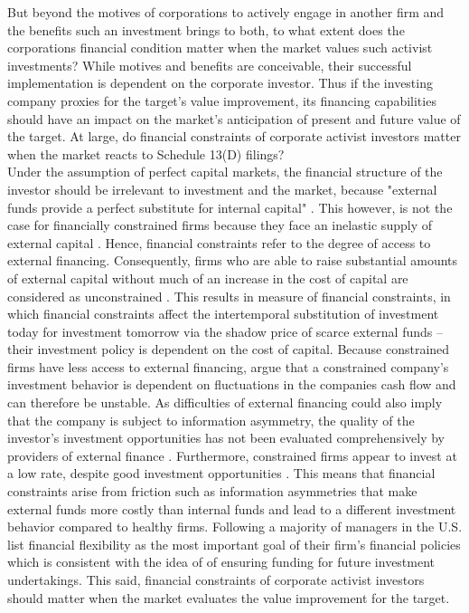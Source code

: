 \documentclass[12pt]{article}
\begin{document}
But beyond the motives of corporations to actively engage in another firm and the benefits such an investment brings to both, to what extent does the corporations financial condition matter when the market values such activist investments?  While motives and benefits are conceivable, their successful implementation is dependent on the corporate investor. 
Thus if the investing company proxies for the target's value improvement, its financing capabilities should have an impact on the market's anticipation of present and future value of the target. At large, do financial constraints of corporate activist investors matter when the market reacts to Schedule 13(D) filings?\\
Under the assumption of perfect capital markets, the financial structure of the investor should be irrelevant to investment and the market, because "external funds provide a perfect substitute for internal capital" \citep[p. 141]{Fazzari1988}. This however, is not the case for financially constrained firms because they face an inelastic supply of external capital \citep[p.1]{Farre-mensa2013}. Hence, financial constraints refer to the degree of access to external financing. Consequently, firms who are able to raise substantial amounts of external capital without much of an increase in the cost of capital are considered as unconstrained \citep[p.1]{Farre-mensa2013}. This results in \citet[p.531]{Whited2006} measure of financial constraints, in which financial constraints affect the intertemporal substitution of investment today for investment tomorrow via the shadow price of scarce external funds -- their investment policy is dependent on the cost of capital. Because constrained firms have less access to external financing, \citet[p. 142]{Fazzari1988} argue that a constrained company's investment behavior is dependent on fluctuations in the companies cash flow and can therefore be unstable. As difficulties of external financing could also imply that the company is subject to information asymmetry, the quality of the investor's investment opportunities has not been evaluated comprehensively by providers of external finance \citep[p.142]{Fazzari1988}. Furthermore, constrained firms appear to invest at a low rate, despite good investment opportunities \citep[p.533]{Whited2006}. This means that financial constraints arise from friction such as information asymmetries that make external funds more costly than internal funds and lead to a different investment behavior compared to healthy firms. 
Following \citet[p.691]{Almeida2011a} a majority of managers in the U.S. list financial flexibility as the most important goal of their firm's financial policies which is consistent with the idea of of ensuring funding for future investment undertakings. This said, financial constraints of corporate activist investors should matter when the market evaluates the value improvement for the target.
\end{document}
